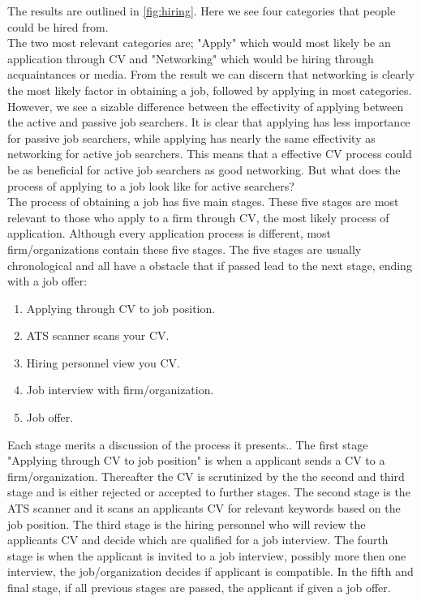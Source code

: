 The results are outlined in \vref{fig:hiring}.
\newpage
Here we see four categories that people could be hired from. \\
The two most relevant categories are; "Apply" which would most likely be an application through CV and "Networking" which would be hiring through acquaintances or media.
From the result we can discern that networking is clearly the most likely factor in obtaining a job, followed by applying in most categories.
However, we see a sizable difference between the effectivity of applying between the active and passive job searchers. 
It is clear that applying has less importance for passive job searchers, while applying has nearly the same effectivity as networking for active job searchers. 
This means that a effective CV process could be as beneficial for active job searchers as good networking.
But what does the process of applying to a job look like for active searchers? \\

The process of obtaining a job has five main stages.
These five stages are most relevant to those who apply to a firm through CV, the most likely process of application.
Although every application process is different, most firm/organizations contain these five stages.
The five stages are usually chronological and all have a obstacle that if passed lead to the next stage, ending with a job offer:
\begin{enumerate}
   \item Applying through CV to job position.
   \item ATS scanner scans your CV.
   \item Hiring personnel view you CV.
   \item Job interview with firm/organization.
   \item Job offer.\cite{Process_steps_unemployment}
\end{enumerate}
Each stage merits a discussion of the process it presents..
The first stage "Applying through CV to job position" is when a applicant sends a CV to a firm/organization.
Thereafter the CV is scrutinized by the the second and third stage and is either rejected or accepted to further stages.
The second stage is the ATS scanner and it scans an applicants CV for relevant keywords based on the job position.
The third stage is the hiring personnel who will review the applicants CV and decide which are qualified for a job interview.
The fourth stage is when the applicant is invited to a job interview, possibly more then one interview, the job/organization decides if applicant is compatible.
In the fifth and final stage, if all previous stages are passed, the applicant if given a job offer. \\

